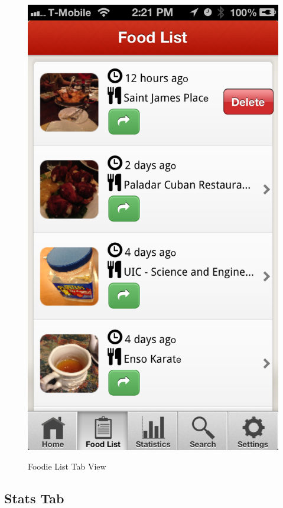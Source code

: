 \begin{figure}
{	\includegraphics[width=\figwidth, totalheight=\figheight, keepaspectratio]{./screenshots/foodlist-delete.png}} \hfill
	\caption{Foodie List Tab View}
	\label{fig:foodielisttab}
\end{figure}


\subsection{Stats Tab} %
\label{sub:stats_tab}

